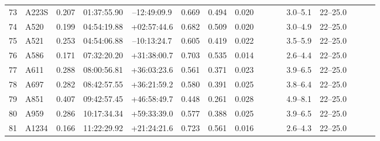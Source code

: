 \documentclass[useAMS,usenatbib]{mnras}
\begin{document}
\begin{table}
\begin{tabular*}{1.0\textwidth}{ l l c c c r c c c c c c c c c c }
73 & A223S & 0.207 & 01:37:55.90 & \hspace{1.5pt}--\hspace{0.5pt}12:49:09.9 & 0.669 & 0.494 & 0.020 \hspace{8pt}& & & \hspace{8pt}& 3.0--5.1 \hspace{8pt}& 22--25.0 \\
74 & A520 & 0.199 & 04:54:19.88 & +02:57:44.6 & 0.682 & 0.509 & 0.020 \hspace{8pt}& & & \hspace{8pt}& 3.0--4.9 \hspace{8pt}& 22--25.0 \\
75 & A521 & 0.253 & 04:54:06.88 & \hspace{1.5pt}--\hspace{0.5pt}10:13:24.7 & 0.605 & 0.419 & 0.022 \hspace{8pt}& & & \hspace{8pt}& 3.5--5.9 \hspace{8pt}& 22--25.0 \\
76 & A586 & 0.171 & 07:32:20.20 & +31:38:00.7 & 0.703 & 0.535 & 0.014 \hspace{8pt}& & & \hspace{8pt}& 2.6--4.4 \hspace{8pt}& 22--25.0 \\
77 & A611 & 0.288 & 08:00:56.81 & +36:03:23.6 & 0.561 & 0.371 & 0.023 \hspace{8pt}& & & \hspace{8pt}& 3.9--6.5 \hspace{8pt}& 22--25.0 \\
78 & A697 & 0.282 & 08:42:57.55 & +36:21:59.2 & 0.580 & 0.391 & 0.025 \hspace{8pt}& & & \hspace{8pt}& 3.8--6.4 \hspace{8pt}& 22--25.0 \\
79 & A851 & 0.407 & 09:42:57.45 & +46:58:49.7 & 0.448 & 0.261 & 0.028 \hspace{8pt}& & & \hspace{8pt}& 4.9--8.1 \hspace{8pt}& 22--25.0 \\
80 & A959 & 0.286 & 10:17:34.34 & +59:33:39.0 & 0.577 & 0.388 & 0.025 \hspace{8pt}& & & \hspace{8pt}& 3.9--6.5 \hspace{8pt}& 22--25.0 \\
81 & A1234 & 0.166 & 11:22:29.92 & +21:24:21.6 & 0.723 & 0.561 & 0.016 \hspace{8pt}& & & \hspace{8pt}& 2.6--4.3 \hspace{8pt}& 22--25.0 \\

\end{tabular*}
\end{table}
\end{document}
